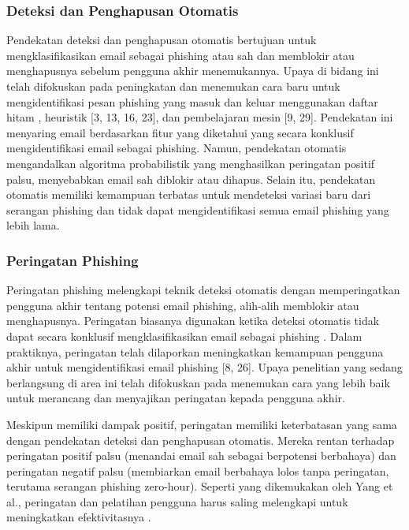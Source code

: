 \documentclass[lettersize,journal]{IEEEtran}
\begin{document}
\subsubsection{Deteksi dan Penghapusan Otomatis}
Pendekatan deteksi dan penghapusan otomatis bertujuan untuk mengklasifikasikan
email sebagai phishing atau sah dan memblokir atau menghapusnya sebelum
pengguna akhir menemukannya. Upaya di bidang ini telah difokuskan pada
peningkatan dan menemukan cara baru untuk mengidentifikasi pesan phishing yang
masuk dan keluar menggunakan daftar hitam \cite{satunol}, heuristik [3, 13, 16,
    23], dan pembelajaran mesin [9, 29]. Pendekatan ini menyaring email berdasarkan
fitur yang diketahui yang secara konklusif mengidentifikasi email sebagai
phishing. Namun, pendekatan otomatis mengandalkan algoritma probabilistik yang
menghasilkan peringatan positif palsu, menyebabkan email sah diblokir atau dihapus. Selain
itu, pendekatan otomatis memiliki kemampuan terbatas untuk mendeteksi variasi
baru dari serangan phishing \cite{satudua} dan tidak dapat mengidentifikasi
semua email phishing yang lebih lama.

\subsubsection{Peringatan Phishing}
Peringatan phishing melengkapi teknik deteksi otomatis dengan memperingatkan
pengguna akhir tentang potensi email phishing, alih-alih memblokir atau
menghapusnya. Peringatan biasanya digunakan ketika deteksi otomatis tidak dapat
secara konklusif mengklasifikasikan email sebagai phishing \cite{dualima}.
Dalam praktiknya, peringatan telah dilaporkan meningkatkan kemampuan pengguna
akhir untuk mengidentifikasi email phishing [8, 26]. Upaya penelitian yang
sedang berlangsung di area ini telah difokuskan pada menemukan cara yang lebih
baik untuk merancang dan menyajikan peringatan kepada pengguna akhir.

Meskipun memiliki dampak positif, peringatan memiliki keterbatasan yang sama
dengan pendekatan deteksi dan penghapusan otomatis. Mereka rentan terhadap
peringatan positif palsu (menandai email sah sebagai berpotensi berbahaya) dan
peringatan negatif palsu (membiarkan email berbahaya lolos tanpa peringatan,
terutama serangan phishing zero-hour). Seperti yang dikemukakan oleh Yang et
al., peringatan dan pelatihan pengguna harus saling melengkapi untuk
meningkatkan efektivitasnya \cite{tigatujuh}.
\end{document}
